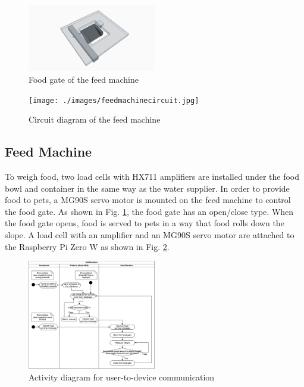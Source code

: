 \documentclass[conference]{IEEEtran}
\begin{document}

\begin{figure}[htbp]
\centerline{\includegraphics[width=0.5\textwidth]{./images/servo_gate.png}}
\caption{Food gate of the feed machine}
\label{fig4}
\end{figure}

\begin{figure}[htbp]
\centerline{\texttt{[image: ./images/feedmachinecircuit.jpg]}}
\caption{Circuit diagram of the feed machine}
\label{fig5}
\end{figure}

\subsection{Feed Machine}
To weigh food, two load cells with HX711 amplifiers are installed under the food bowl and container in the same way as the water supplier.
In order to provide food to pets, a MG90S servo motor is mounted on the feed machine to control the food gate.
As shown in Fig. \ref{fig4}, the food gate has an open/close type. When the food gate opens, food is served to pets in a way that food rolls down the slope.
A load cell with an amplifier and an MG90S servo motor are attached to the Raspberry Pi Zero W as shown in Fig. \ref{fig5}.

\begin{figure}[htbp]
\centerline{\includegraphics[width=0.5\textwidth]{./images/user2device.png}}
\caption{Activity diagram for user-to-device communication}
\label{fig6}
\end{figure}
\end{document}
